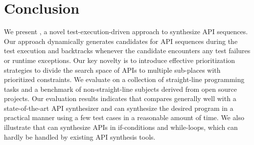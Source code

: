 \section{Conclusion}\label{sec:conclude}


We present \tool, a novel test-execution-driven approach to synthesize API sequences. Our approach dynamically generates candidates for API sequences during the test execution and backtracks whenever the candidate encounters any test failures or runtime exceptions. Our key novelty is to introduce effective prioritization strategies to divide the search space of APIs to multiple sub-places with prioritized constraints. %
We evaluate \tool on a collection of straight-line programming tasks and a benchmark of non-straight-line subjects derived from open source projects. Our evaluation results indicates that \tool compares generally well with a state-of-the-art API synthesizer and \tool can synthesize the desired program in a practical manner using a few test cases in a reasonable amount of time. We also illustrate that \tool can synthesize APIs in if-conditions and while-loops, which can hardly be handled by existing API synthesis tools.  
